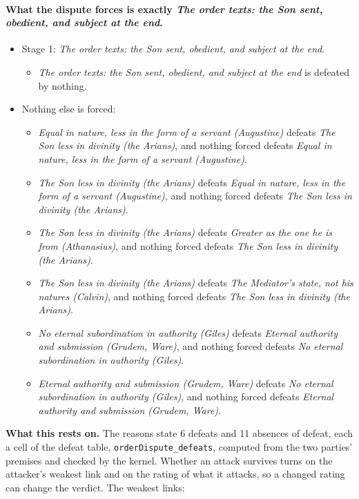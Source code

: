 \documentclass[11pt,paper=\testimonypaper,DIV=13,parskip=false]{scrartcl}
\begin{document}
\paragraph{What the dispute forces is exactly \emph{The order texts: the Son sent, obedient, and subject at the end}.}
\begin{itemize}
\item Stage 1: \emph{The order texts: the Son sent, obedient, and subject at the end}.
\begin{itemize}
\item \emph{The order texts: the Son sent, obedient, and subject at the end} is defeated by nothing.
\end{itemize}
\item Nothing else is forced:
\begin{itemize}
\item \emph{Equal in nature, less in the form of a servant (Augustine)} defeats \emph{The Son less in divinity (the Arians)}, and nothing forced defeats \emph{Equal in nature, less in the form of a servant (Augustine)}.
\item \emph{The Son less in divinity (the Arians)} defeats \emph{Equal in nature, less in the form of a servant (Augustine)}, and nothing forced defeats \emph{The Son less in divinity (the Arians)}.
\item \emph{The Son less in divinity (the Arians)} defeats \emph{Greater as the one he is from (Athanasius)}, and nothing forced defeats \emph{The Son less in divinity (the Arians)}.
\item \emph{The Son less in divinity (the Arians)} defeats \emph{The Mediator’s state, not his natures (Calvin)}, and nothing forced defeats \emph{The Son less in divinity (the Arians)}.
\item \emph{No eternal subordination in authority (Giles)} defeats \emph{Eternal authority and submission (Grudem, Ware)}, and nothing forced defeats \emph{No eternal subordination in authority (Giles)}.
\item \emph{Eternal authority and submission (Grudem, Ware)} defeats \emph{No eternal subordination in authority (Giles)}, and nothing forced defeats \emph{Eternal authority and submission (Grudem, Ware)}.
\end{itemize}
\end{itemize}
\par\noindent\textbf{What this rests on.} The reasons state 6 defeats and 11 absences of defeat, each a cell of the defeat table, \texttt{order\allowbreak{}Dispute\_\allowbreak{}defeats}, computed from the two parties' premises and checked by the kernel. Whether an attack survives turns on the attacker's weakest link and on the rating of what it attacks, so a changed rating can change the verdict. The weakest links:
\end{document}
